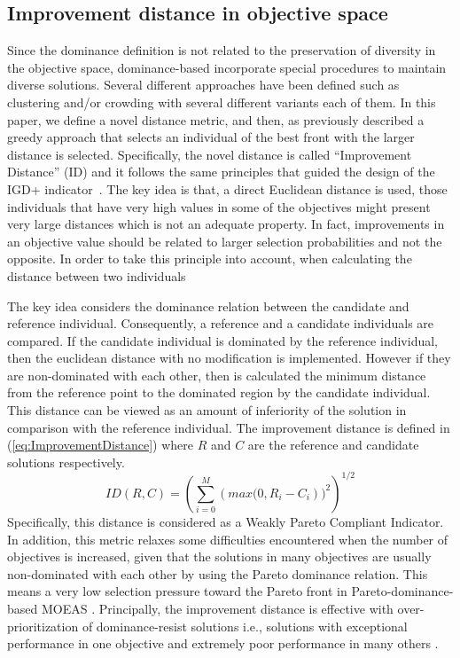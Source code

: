 \subsection{Improvement distance in objective space}

Since the dominance definition is not related to the preservation of diversity in the objective space,
dominance-based \MOEAS{} incorporate special procedures to maintain diverse solutions.
%
Several different approaches have been defined such as clustering and/or crowding with several different 
variants each of them.
%
In this paper, we define a novel distance metric, and then, as previously described a greedy approach
that selects an individual of the best front with the larger distance is selected.
%
Specifically, the novel distance is called ``Improvement Distance'' (ID) and it 
follows the same principles that guided the design of the IGD+ indicator~\cite{Joel:Inverted_Generational_Distance_Plus}.
%
The key idea is that, a direct Euclidean distance is used, those individuals that have very high values in some
of the objectives might present very large distances which is not an adequate property.
%
In fact, improvements in an objective value should be related to larger selection probabilities and not the opposite.
%
In order to take this principle into account, when calculating the distance between two individuals

The key idea considers the dominance relation between the candidate and reference individual.%
%
%
Consequently, a reference and a candidate individuals are compared.
%
If the candidate individual is dominated by the reference individual, then the euclidean distance with no modification is implemented.
%
However if they are non-dominated with each other, then is calculated the minimum distance from the reference point to the dominated region by the candidate individual. %
This distance can be viewed as an amount of inferiority of the solution in comparison with the reference individual.	
%
The improvement distance is defined in (\ref{eq:ImprovementDistance}) where $R$ and $C$ are the reference and candidate solutions respectively. 
\begin{equation} \label{eq:ImprovementDistance}
ID(R, C) = \left (\sum_{i=0}^M \left (max(0, R_i - C_i \right ))^2  \right)^{1/2}
\end{equation}
Specifically, this distance is considered as a Weakly Pareto Compliant Indicator.
%
In addition, this metric relaxes some difficulties encountered when the number of objectives is increased, given that the solutions in many objectives are usually non-dominated with each other by using the Pareto dominance relation.
%
This means a very low selection pressure toward the Pareto front in Pareto-dominance-based MOEAS \cite{Joel:Optimization_Of_Scalarizing_Functions_Through_Evolutionary_MOEAS}.
%
Principally, the improvement distance is effective with over-prioritization  of dominance-resist solutions i.e., solutions with exceptional performance in one objective and extremely poor performance in many others \cite{Joel:Failure_MOEAs}.
%


